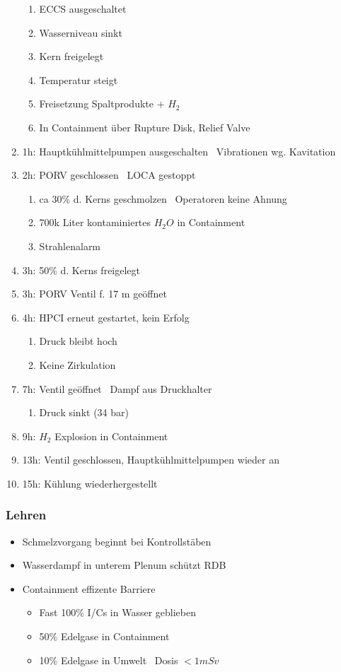 \documentclass[12pt]{article}
\begin{document}
\begin{enumerate}
\begin{enumerate}[label = \textrightarrow]
			\item ECCS ausgeschaltet
			\item Wasserniveau sinkt
			\item Kern freigelegt
			\item Temperatur steigt
			\item Freisetzung Spaltprodukte + \(H_2\)
			\item In Containment über Rupture Disk, Relief Valve
		\end{enumerate}
	\item 1h: Hauptkühlmittelpumpen ausgeschalten \textrightarrow\ Vibrationen wg. Kavitation
	\item 2h: PORV geschlossen \textrightarrow\ LOCA gestoppt
		\begin{enumerate}[label = \textrightarrow]
			\item ca 30\% d. Kerns geschmolzen \textrightarrow\ Operatoren keine Ahnung
			\item 700k Liter kontaminiertes \(H_2O\) in Containment
			\item Strahlenalarm
		\end{enumerate}
	\item 3h: 50\% d. Kerns freigelegt
	\item 3h: PORV Ventil f. 17 m geöffnet
	\item 4h: HPCI erneut gestartet, kein Erfolg
		\begin{enumerate}[label = \textrightarrow]
			\item Druck bleibt hoch
			\item Keine Zirkulation
		\end{enumerate}
	\item 7h: Ventil geöffnet \textrightarrow\ Dampf aus Druckhalter
		\begin{enumerate}[label = \textrightarrow]
			\item Druck sinkt (34 bar)
		\end{enumerate}
	\item 9h: \(H_2\) Explosion in Containment
	\item 13h: Ventil geschlossen, Hauptkühlmittelpumpen wieder an
	\item 15h: Kühlung wiederhergestellt
\end{enumerate}

\subsubsection{Lehren}
\begin{itemize}
	\item Schmelzvorgang beginnt bei Kontrollstäben
	\item Wasserdampf in unterem Plenum schützt RDB
	\item Containment effizente Barriere
		\begin{itemize}
			\item Fast 100\% I/Cs in Wasser geblieben
			\item 50\% Edelgase in Containment
			\item 10\% Edelgase in Umwelt \textrightarrow\ Dosis \(<1 mSv\)
		\end{itemize}
\end{itemize}
\end{document}
